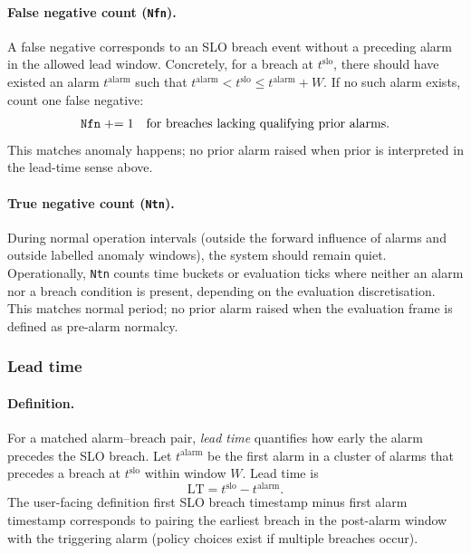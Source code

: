 \documentclass[sigconf]{acmart}
\begin{document}
\paragraph{False negative count (\texttt{Nfn}).}
A false negative corresponds to an SLO breach event without a preceding alarm in the allowed lead window. Concretely, for a breach at $t^{\mathrm{slo}}$, there should have existed an alarm $t^{\mathrm{alarm}}$ such that $t^{\mathrm{alarm}} < t^{\mathrm{slo}} \le t^{\mathrm{alarm}}+W$. If no such alarm exists, count one false negative:
\begin{equation}
  \text{\texttt{Nfn}} \mathrel{+}= 1 \quad \text{for breaches lacking qualifying prior alarms.}
\end{equation}
This matches anomaly happens; no prior alarm raised when prior is interpreted in the lead-time sense above.

\paragraph{True negative count (\texttt{Ntn}).}
During normal operation intervals (outside the forward influence of alarms and outside labelled anomaly windows), the system should remain quiet. Operationally, \texttt{Ntn} counts time buckets or evaluation ticks where neither an alarm nor a breach condition is present, depending on the evaluation discretisation. This matches normal period; no prior alarm raised when the evaluation frame is defined as pre-alarm normalcy.

\subsubsection*{Lead time}

\paragraph{Definition.}
For a matched alarm--breach pair, \emph{lead time} quantifies how early the alarm precedes the SLO breach. Let $t^{\mathrm{alarm}}$ be the first alarm in a cluster of alarms that precedes a breach at $t^{\mathrm{slo}}$ within window $W$. Lead time is
\begin{equation}
  \mathrm{LT} = t^{\mathrm{slo}} - t^{\mathrm{alarm}}.
\end{equation}
The user-facing definition first SLO breach timestamp minus first alarm timestamp corresponds to pairing the earliest breach in the post-alarm window with the triggering alarm (policy choices exist if multiple breaches occur).
\end{document}
